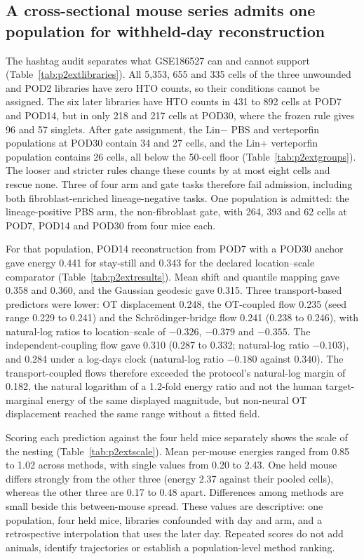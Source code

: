 \documentclass[10pt,a4paper]{article}
\begin{document}
\subsection{A cross-sectional mouse series admits one population for withheld-day reconstruction}

The hashtag audit separates what GSE186527 can and cannot support (Table~\ref{tab:p2extlibraries}). All 5,353, 655 and 335 cells of the three unwounded and POD2 libraries have zero HTO counts, so their conditions cannot be assigned. The six later libraries have HTO counts in 431 to 892 cells at POD7 and POD14, but in only 218 and 217 cells at POD30, where the frozen rule gives 96 and 57 singlets. After gate assignment, the Lin$-$ PBS and verteporfin populations at POD30 contain 34 and 27 cells, and the Lin+ verteporfin population contains 26 cells, all below the 50-cell floor (Table~\ref{tab:p2extgroups}). The looser and stricter rules change these counts by at most eight cells and rescue none. Three of four arm and gate tasks therefore fail admission, including both fibroblast-enriched lineage-negative tasks. One population is admitted: the lineage-positive PBS arm, the non-fibroblast gate, with 264, 393 and 62 cells at POD7, POD14 and POD30 from four mice each.

For that population, POD14 reconstruction from POD7 with a POD30 anchor gave energy 0.441 for stay-still and 0.343 for the declared location--scale comparator (Table~\ref{tab:p2extresults}). Mean shift and quantile mapping gave 0.358 and 0.360, and the Gaussian geodesic gave 0.315. Three transport-based predictors were lower: OT displacement 0.248, the OT-coupled flow 0.235 (seed range 0.229 to 0.241) and the Schr\"odinger-bridge flow 0.241 (0.238 to 0.246), with natural-log ratios to location--scale of $-0.326$, $-0.379$ and $-0.355$. The independent-coupling flow gave 0.310 (0.287 to 0.332; natural-log ratio $-0.103$), and 0.284 under a log-days clock (natural-log ratio $-0.180$ against 0.340). The transport-coupled flows therefore exceeded the protocol's natural-log margin of 0.182, the natural logarithm of a 1.2-fold energy ratio and not the human target-marginal energy of the same displayed magnitude, but non-neural OT displacement reached the same range without a fitted field.

Scoring each prediction against the four held mice separately shows the scale of the nesting (Table~\ref{tab:p2extscale}). Mean per-mouse energies ranged from 0.85 to 1.02 across methods, with single values from 0.20 to 2.43. One held mouse differs strongly from the other three (energy 2.37 against their pooled cells), whereas the other three are 0.17 to 0.48 apart. Differences among methods are small beside this between-mouse spread. These values are descriptive: one population, four held mice, libraries confounded with day and arm, and a retrospective interpolation that uses the later day. Repeated scores do not add animals, identify trajectories or establish a population-level method ranking.
\end{document}
